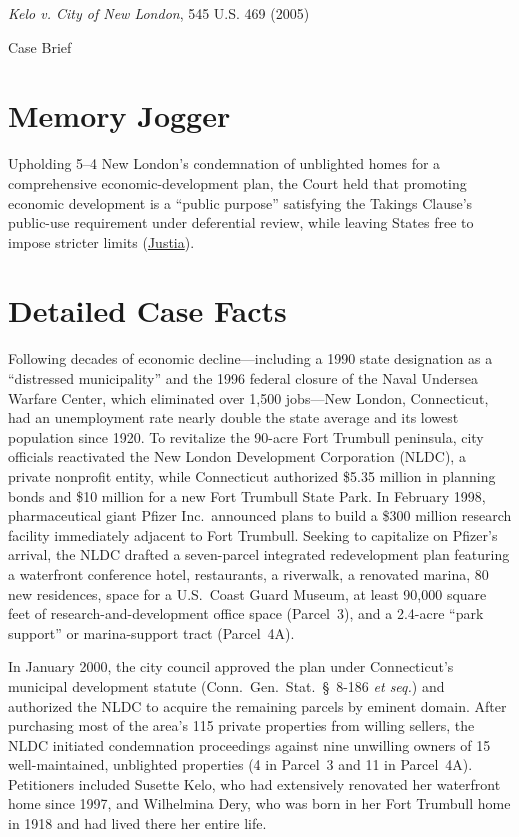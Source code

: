 \documentclass[12pt]{article}
\begin{document}
\begin{center}
{\LARGE \textit{Kelo v. City of New London}, 545 U.S. 469 (2005)\par}
\vspace{0.8em}
{\large Case Brief\par}
\end{center}
\vspace{1em}

\section{Memory Jogger}
Upholding 5--4 New London's condemnation of unblighted homes for a comprehensive economic-development plan, the Court held that promoting economic development is a ``public purpose'' satisfying the Takings Clause's public-use requirement under deferential review, while leaving States free to impose stricter limits (\href{https://supreme.justia.com/cases/federal/us/545/469/}{Justia}).

\section{Detailed Case Facts}
Following decades of economic decline---including a 1990 state designation as a ``distressed municipality'' and the 1996 federal closure of the Naval Undersea Warfare Center, which eliminated over 1,500 jobs---New London, Connecticut, had an unemployment rate nearly double the state average and its lowest population since 1920. To revitalize the 90-acre Fort Trumbull peninsula, city officials reactivated the New London Development Corporation (NLDC), a private nonprofit entity, while Connecticut authorized \$5.35 million in planning bonds and \$10 million for a new Fort Trumbull State Park. In February 1998, pharmaceutical giant Pfizer Inc.\ announced plans to build a \$300 million research facility immediately adjacent to Fort Trumbull. Seeking to capitalize on Pfizer's arrival, the NLDC drafted a seven-parcel integrated redevelopment plan featuring a waterfront conference hotel, restaurants, a riverwalk, a renovated marina, 80 new residences, space for a U.S.\ Coast Guard Museum, at least 90,000 square feet of research-and-development office space (Parcel~3), and a 2.4-acre ``park support'' or marina-support tract (Parcel~4A).

In January 2000, the city council approved the plan under Connecticut's municipal development statute (Conn.\ Gen.\ Stat.\ \S~8-186 \textit{et seq.}) and authorized the NLDC to acquire the remaining parcels by eminent domain. After purchasing most of the area's 115 private properties from willing sellers, the NLDC initiated condemnation proceedings against nine unwilling owners of 15 well-maintained, unblighted properties (4 in Parcel~3 and 11 in Parcel~4A). Petitioners included Susette Kelo, who had extensively renovated her waterfront home since 1997, and Wilhelmina Dery, who was born in her Fort Trumbull home in 1918 and had lived there her entire life.
\end{document}
